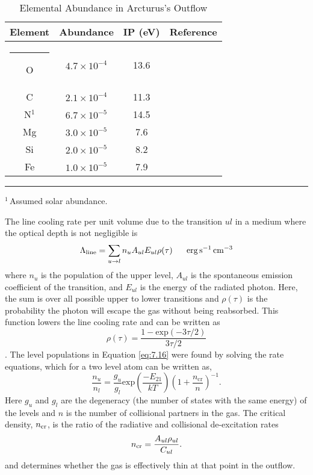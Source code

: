 \begin{table}[!ht]
\begin{center}
\caption[Elemental Abundance in Arcturus's Outflow]{Elemental Abundance in Arcturus's Outflow}
\begin{tabular}{cccc}
\hline
\hline
\rule{0pt}{2.5ex} Element & Abundance & IP (eV) & Reference \\
\hline
\rule{-2.5pt}{2.5ex}	O &  $4.7\times 10^{-4}$ & 13.6 & \cite{ramirez_2011}\\
					C &  $2.1\times 10^{-4}$ & 11.3 & \cite{ramirez_2011}\\
					N$^{1}$ &  $6.7\times 10^{-5}$& 14.5 & \cite{asplund_2009}\\
					Mg & $3.0\times 10^{-5}$ & 7.6 & \cite{ramirez_2011}\\
					Si & $2.0\times 10^{-5}$ & 8.2 & \cite{ramirez_2011}\\
					Fe & $1.0\times 10^{-5}$ & 7.9 & \cite{decin_2003}\\
\hline
\end{tabular}
\label{tab:7.1}
\begin{minipage}{12.5cm}
\rule{-2.5pt}{2.5ex}{\footnotesize $^{1}$\,Assumed solar abundance.}
\end{minipage}
\end{center}
\end{table}

The line cooling rate per unit volume due to the transition $ul$ in a medium where the optical depth is not negligible is 
\begin{equation}\label{eq:7.16}
\Lambda _{\rm{line}} =\sum_{u\rightarrow l} n_{u}A_{ul}E_{ul}\rho (\tau) \ \ \ \ \ \rm{erg}\,\rm{s^{-1}\,cm^{-3}}
\end{equation}
where $n_{u}$ is the population of the upper level, $A_{ul}$ is the spontaneous emission coefficient of the transition, and $E_{ul}$ is the energy of the radiated photon. Here, the sum is over all possible upper to lower transitions and $\rho (\tau)$ is the probability the photon will escape the gas without being reabsorbed. This function lowers the line cooling rate and can be written as 
\begin{equation}
\rho (\tau) = \frac{1-\mathrm{exp}(-3\tau /2)}{3\tau /2}
\end{equation}
\citep{castor_2004}. The level populations in Equation \ref{eq:7.16} were found by solving the rate equations, which for a two level atom can be written as,
\begin{equation}
\frac{n_u}{n_l}=\frac{g_u}{g_l}\mathrm{exp} \left( \frac{-E_{21}}{kT}\right)\left( 1+\frac{n_{\mathrm{cr}}}{n} \right)^{-1}.
\end{equation}
Here $g_{u}$ and $g_{l}$ are the degeneracy (the number of states with the same energy) of the levels and $n$ is the number of collisional partners in the gas. The critical density, $n_{\rm{cr}}$, is the ratio of the radiative and collisional de-excitation rates
\begin{equation}
n_{\rm{cr}}=\frac{A_{ul}\rho _{ul}}{C_{ul}}.
\end{equation}
and determines whether the gas is effectively thin at that point in the outflow.

